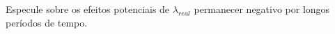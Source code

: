Especule sobre os efeitos potenciais de $\lambda_{real}$ permanecer negativo por longos períodos de tempo.
